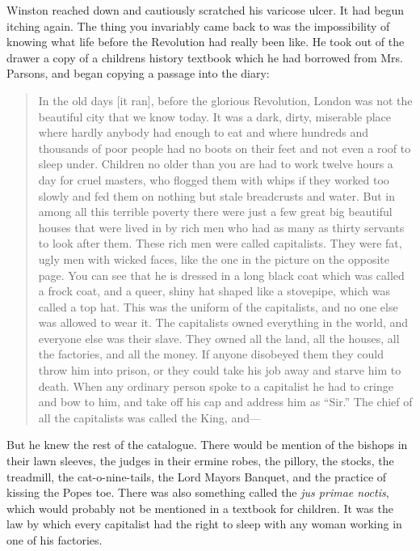 Winston reached down and cautiously scratched his varicose ulcer. It had
begun itching again. The thing you invariably came back to was the
impossibility of knowing what life before the Revolution had really been
like. He took out of the drawer a copy of a children\textquotesingle s
history textbook which he had borrowed from Mrs. Parsons, and began
copying a passage into the diary:

\begin{quotation}
  In the old days [it ran], before the glorious Revolution, London was not
  the beautiful city that we know today. It was a dark, dirty, miserable
  place where hardly anybody had enough to eat and where hundreds and
  thousands of poor people had no boots on their feet and not even a roof to
  sleep under. Children no older than you are had to work twelve hours a day
  for cruel masters, who flogged them with whips if they worked too slowly
  and fed them on nothing but stale breadcrusts and water. But in among all
  this terrible poverty there were just a few great big beautiful houses
  that were lived in by rich men who had as many as thirty servants to look
  after them. These rich men were called capitalists. They were fat, ugly
  men with wicked faces, like the one in the picture on the opposite page.
  You can see that he is dressed in a long black coat which was called a
  frock coat, and a queer, shiny hat shaped like a stovepipe, which was
  called a top hat. This was the uniform of the capitalists, and no one else
  was allowed to wear it. The capitalists owned everything in the world, and
  everyone else was their slave. They owned all the land, all the houses,
  all the factories, and all the money. If anyone disobeyed them they could
  throw him into prison, or they could take his job away and starve him to
  death. When any ordinary person spoke to a capitalist he had to cringe and
  bow to him, and take off his cap and address him as ``Sir.'' The chief of
  all the capitalists was called the King, and---
\end{quotation}

But he knew the rest of the catalogue. There would be mention of the
bishops in their lawn sleeves, the judges in their ermine robes, the
pillory, the stocks, the treadmill, the
cat-o\textquotesingle-nine-tails, the Lord Mayor\textquotesingle s
Banquet, and the practice of kissing the Pope\textquotesingle s toe.
There was also something called the \emph{jus primae noctis}, which
would probably not be mentioned in a textbook for children. It was the
law by which every capitalist had the right to sleep with any woman
working in one of his factories.

